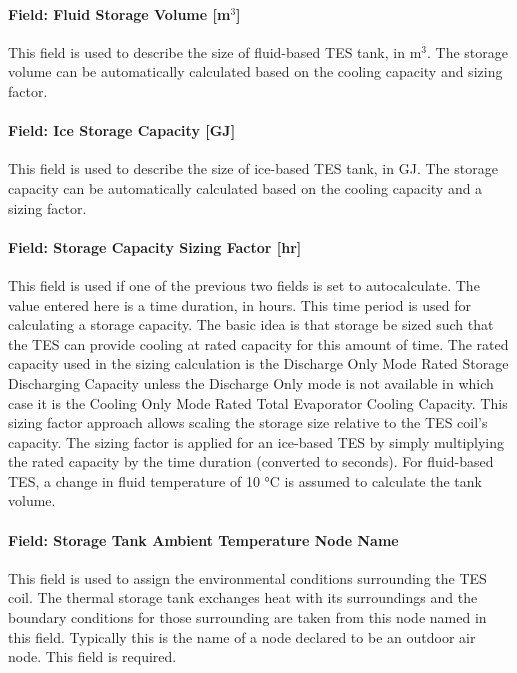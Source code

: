 \paragraph{Field: Fluid Storage Volume {[}m\(^{3}\){]}}\label{field-fluid-storage-volume-m3}

This field is used to describe the size of fluid-based TES tank, in m\(^{3}\). The storage volume can be automatically calculated based on the cooling capacity and sizing factor.

\paragraph{Field: Ice Storage Capacity {[}GJ{]}}\label{field-ice-storage-capacity-gj}

This field is used to describe the size of ice-based TES tank, in GJ. The storage capacity can be automatically calculated based on the cooling capacity and a sizing factor.

\paragraph{Field: Storage Capacity Sizing Factor {[}hr{]}}\label{field-storage-capacity-sizing-factor-hr}

This field is used if one of the previous two fields is set to autocalculate. The value entered here is a time duration, in hours. This time period is used for calculating a storage capacity. The basic idea is that storage be sized such that the TES can provide cooling at rated capacity for this amount of time. The rated capacity used in the sizing calculation is the Discharge Only Mode Rated Storage Discharging Capacity unless the Discharge Only mode is not available in which case it is the Cooling Only Mode Rated Total Evaporator Cooling Capacity. This sizing factor approach allows scaling the storage size relative to the TES coil's capacity. The sizing factor is applied for an ice-based TES by simply multiplying the rated capacity by the time duration (converted to seconds). For fluid-based TES, a change in fluid temperature of 10 °C is assumed to calculate the tank volume.

\paragraph{Field: Storage Tank Ambient Temperature Node Name}\label{field-storage-tank-ambient-temperature-node-name}

This field is used to assign the environmental conditions surrounding the TES coil. The thermal storage tank exchanges heat with its surroundings and the boundary conditions for those surrounding are taken from this node named in this field. Typically this is the name of a node declared to be an outdoor air node. This field is required.

